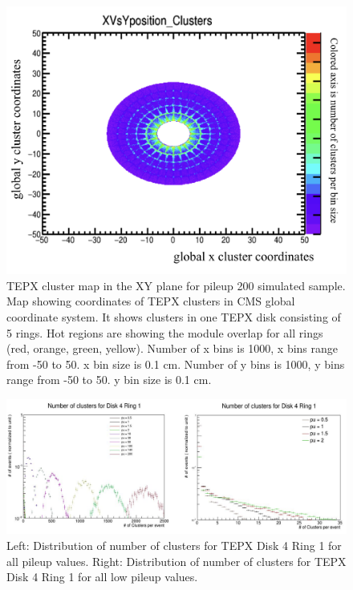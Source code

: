 \begin{figure}[H]
  \centering
  \includegraphics[width=1\columnwidth]{ashish_thesis/tepx_clusters.png}
  \caption{TEPX cluster map in the XY plane for pileup 200 simulated sample. Map showing coordinates of TEPX clusters in CMS global coordinate system. It shows clusters in one TEPX disk consisting of 5 rings. Hot regions are showing the module overlap for all rings (red, orange, green, yellow). Number of x bins is 1000, x bins range from -50 to 50. x bin size is 0.1 cm. Number of y bins is 1000, y bins range from -50 to 50. y bin size is 0.1 cm.}
  \label{fig:tepx_cl}
\end{figure}


\begin{figure}[H]
  \centering
  \includegraphics[width=1\columnwidth]{ashish_thesis/tepx_D4R!_clusters._allpupng.png}
  \caption{Left: Distribution of number of clusters for TEPX Disk 4 Ring 1 for all pileup values. Right: Distribution of number of clusters for TEPX Disk 4 Ring 1 for all low pileup values. }
  \label{fig:tepx_cl_allPU}
\end{figure}

